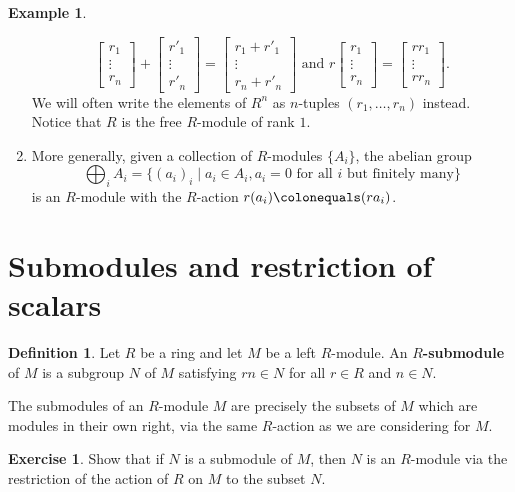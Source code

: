 \documentclass[12pt]{report}
\numberwithin{equation}{section}
\numberwithin{theorem}{chapter}
\theoremstyle{definition}
\newtheorem{definition}[theorem]{Definition}
\newtheorem{example}[theorem]{Example}
\newtheorem{exercise}{Exercise}
\newtheorem*{basic properties}{Basic Properties}
\newtheorem*{Important Remark}{Important Remark}
\newcommand{\df}[1]{{\bf #1}\index{#1}}
\begin{document}
\begin{example}
\begin{enumerate}[label=(\arabic*)]
$$\begin{bmatrix} r_1\\ \vdots\\r_n \end{bmatrix} +\begin{bmatrix} r'_1\\ \vdots\\r'_n \end{bmatrix} =\begin{bmatrix} r_1+r'_1\\ \vdots\\r_n +r'_n\end{bmatrix} \text{ and } r\begin{bmatrix} r_1\\ \vdots\\r_n \end{bmatrix}=\begin{bmatrix} rr_1\\ \vdots\\ rr_n \end{bmatrix}. $$
We will often write the elements of $R^n$ as $n$-tuples $(r_1, \ldots, r_n)$ instead. Notice that $R$ is the free $R$-module of rank $1$.
\item More generally, given a collection of $R$-modules $\{ A_i \}$, the abelian group
$$\bigoplus_i A_i = \{ (a_i)_i \mid a_i \in A_i, a_i = 0 \textrm{ for all $i$ but finitely many} \}$$
is an $R$-module with the $R$-action $r(a_i) \colonequals (ra_i)$.
\end{enumerate}
\end{example}




\section{Submodules and restriction of scalars}

\begin{definition} 
Let $R$ be a ring and let $M$ be a left $R$-module. An \df{$R$-submodule} of $M$ is a subgroup $N$ of $M$ satisfying $rn \in N$ for all $r \in R$ and $n \in N$.
\end{definition}

The submodules of an $R$-module $M$ are precisely the subsets of $M$ which are modules in their own right, via the same $R$-action as we are considering for $M$.

\begin{exercise}
	Show that if $N$ is a submodule of $M$, then $N$ is an $R$-module via the restriction of the action of $R$ on $M$ to the subset $N$.
\end{exercise}
\end{document}
